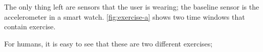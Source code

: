 The only thing left are sensors that the user is wearing; the baseline sensor is the accelerometer in a smart watch. \autoref{fig:exercise-a} shows two time windows that contain exercise.


For humans, it is easy to see that these are two different exercises;

\printbibliography

 